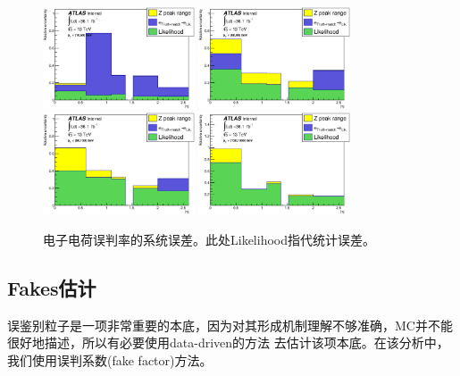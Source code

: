 \begin{figure}[h]
\centering
  \includegraphics[width=0.4\textwidth]{fig/QmisID/Syst1_tight.eps}
  \includegraphics[width=0.4\textwidth]{fig/QmisID/Syst2_tight.eps}
  \includegraphics[width=0.4\textwidth]{fig/QmisID/Syst3_tight.eps}
  \includegraphics[width=0.4\textwidth]{fig/QmisID/Syst4_tight.eps}
  \caption{电子电荷误判率的系统误差。此处Likelihood指代统计误差。}
\label{fig:QmisID_syst}
\end{figure}
\clearpage
\subsection{Fakes估计}
误鉴别粒子是一项非常重要的本底，因为对其形成机制理解不够准确，MC并不能很好地描述，所以有必要使用data-driven的方法
去估计该项本底。在该分析中，我们使用误判系数(fake factor)方法。

